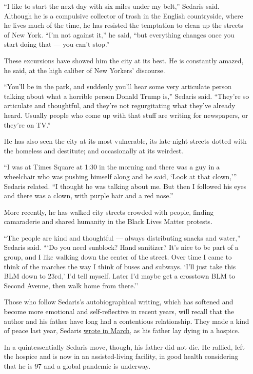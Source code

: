 ``I like to start the next day with six miles under my belt,'' Sedaris
said. Although he is a compulsive collector of trash in the English
countryside, where he lives much of the time, he has resisted the
temptation to clean up the streets of New York. ``I'm not against it,''
he said, ``but everything changes once you start doing that --- you
can't stop.''

These excursions have showed him the city at its best. He is constantly
amazed, he said, at the high caliber of New Yorkers' discourse.

``You'll be in the park, and suddenly you'll hear some very articulate
person talking about what a horrible person Donald Trump is,'' Sedaris
said. ``They're so articulate and thoughtful, and they're not
regurgitating what they've already heard. Usually people who come up
with that stuff are writing for newspapers, or they're on TV.''

He has also seen the city at its most vulnerable, its late-night streets
dotted with the homeless and destitute; and occasionally at its
weirdest.

``I was at Times Square at 1:30 in the morning and there was a guy in a
wheelchair who was pushing himself along and he said, `Look at that
clown,''' Sedaris related. ``I thought he was talking about me. But then
I followed his eyes and there was a clown, with purple hair and a red
nose.''

More recently, he has walked city streets crowded with people, finding
camaraderie and shared humanity in the Black Lives Matter protests.

``The people are kind and thoughtful --- always distributing snacks and
water,'' Sedaris said. ```Do you need sunblock? Hand sanitizer? It's
nice to be part of a group, and I like walking down the center of the
street. Over time I came to think of the marches the way I think of
buses and subways. `I'll just take this BLM down to 23rd,' I'd tell
myself. Later I'd maybe get a crosstown BLM to Second Avenue, then walk
home from there.''

Those who follow Sedaris's autobiographical writing, which has softened
and become more emotional and self-reflective in recent years, will
recall that the author and his father have long had a contentious
relationship. They made a kind of peace last year, Sedaris
\href{https://www.newyorker.com/magazine/2020/03/02/unbuttoned}{wrote in
March}, as his father lay dying in a hospice.

In a quintessentially Sedaris move, though, his father did not die. He
rallied, left the hospice and is now in an assisted-living facility, in
good health considering that he is 97 and a global pandemic is underway.

